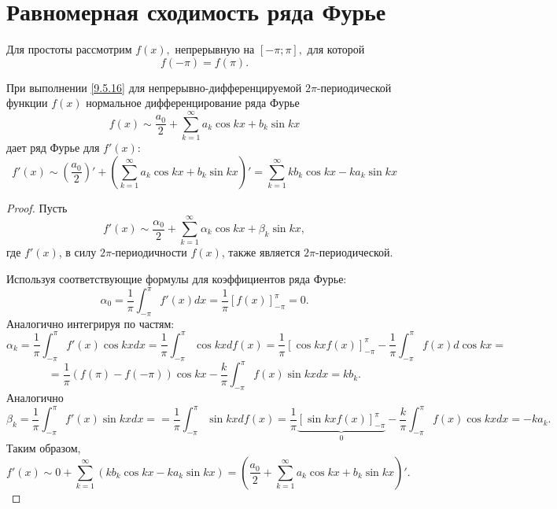 \documentclass[../../main.tex]{subfiles}
\begin{document}
\section{Равномерная сходимость ряда Фурье}
	Для простоты рассмотрим $f(x),$ непрерывную на $[-\pi; \pi],$ для которой 
	\begin{equation}\label{9.5.16}
	f(-\pi) = f(\pi).
	\end{equation}
	\begin{thm}
		При выполнении \ref{9.5.16} для непрерывно-дифференцируемой $2\pi$-периодической функции $f(x)$ нормальное дифференцирование ряда Фурье
		\[
		f(x) \sim \frac{a_0}{2} + \sum_{k=1}^{\infty}  a_k \cos k x +
		b_k \sin k x
		\]
		дает ряд Фурье для $f'(x):$
		\begin{equation} \label{9.5.17}
			f'(x) \sim \left(\frac{a_0}{2}\right)' + \left(\sum_{k=1}^{\infty}  a_k \cos k x +
			b_k \sin k x\right)' = \sum_{k=1}^{\infty} k b_k \cos k x - k
			a_k \sin k x
		\end{equation}
	\end{thm}
	\begin{proof}
		Пусть
		\[
			f'(x) \sim \frac{\alpha_0}{2} + \sum_{k=1}^{\infty}  \alpha_k \cos k x +
			\beta_k \sin k x,
		\]
		где $f'(x)$, в силу $2\pi$-периодичности $f(x)$, также является $2\pi$-периодической.
		
		Используя соответствующие формулы для коэффициентов ряда Фурье:
		\[
			\alpha_0 = \frac{1}{\pi} \int_{-\pi}^{\pi} f'(x) dx = \frac{1}{\pi} \left[f(x)\right]_{-\pi}^{\pi} = 0.
		\]
		Аналогично интегрируя по частям:
		\[
			\alpha_k = \frac{1}{\pi} \int_{-\pi}^{\pi} f'(x) \cos kx dx = \frac{1}{\pi} \int_{-\pi}^{\pi} \cos kx df(x)  = \frac{1}{\pi} \left[\cos kx f(x)\right]_{-\pi}^{\pi} -
			\frac{1}{\pi} \int_{-\pi}^{\pi} f(x)d \cos kx = 
			\]
			\[ =
			\frac{1}{\pi} (f(\pi) - f(-\pi)) \cos kx -
			\frac{k}{\pi} \int_{-\pi}^{\pi} f(x)\sin kxd x = k b_k.
		\]
		Аналогично
		\[
			\beta_k = \frac{1}{\pi} \int_{-\pi}^{\pi} f'(x) \sin kx dx =
			= \frac{1}{\pi} \int_{-\pi}^{\pi} \sin kx df(x)  =
			\frac{1}{\pi} \underbrace{\left[\sin kx f(x)\right]_{-\pi}^{\pi}}_{0} -
			\frac{k}{\pi} \int_{-\pi}^{\pi} f(x) \cos kx dx = -ka_k.
		\]
		Таким образом, 
		\[
		f'(x) \sim 0 + \sum_{k=1}^{\infty}( k b_k \cos k x - k
		a_k \sin k x) = \left(\frac{a_0}{2} + \sum_{k=1}^{\infty}  a_k \cos k x +
		b_k \sin k x\right)'.
		\]
	\end{proof}
\end{document}
